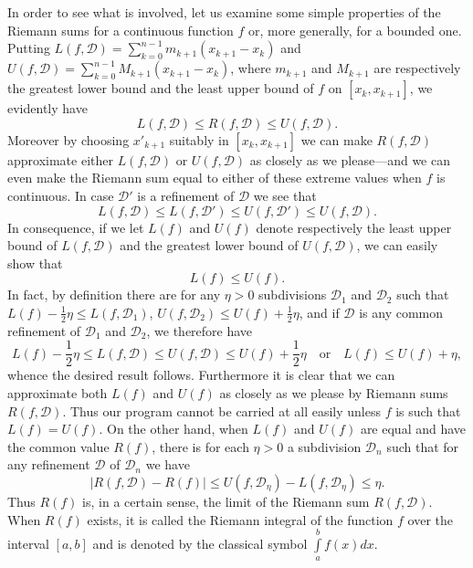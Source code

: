 In order to see what is involved, let us examine some simple
properties of the Riemann sums for a continuous function $f$ or, more
generally, for a bounded one. Putting $L(f,\mathscr{D}) =
\sum\limits^{n-1}_{k=0} m_{k+1} (x_{k+1} - x_k)$ and $U(f,\mathscr{D})
= \sum\limits^{n-1}_{k=0} M_{k+1} (x_{k+1} - x_k)$, where $m_{k+1}$
and $M_{k+1}$ are respectively the greatest lower bound and the least
upper bound of $f$ on $[x_k, x_{k+1}]$, we evidently have
$$
L (f,\mathscr{D}) \leqslant R (f, \mathscr{D}) \leqslant U (f, \mathscr{D}).
$$
Moreover by choosing $x'_{k+1}$ suitably in $[x_k, x_{k+1}]$ we can
make $R(f, \mathscr{D})$ approximate either $L(f, \mathscr{D})$ or
$U(f, \mathscr{D})$ as closely as we please---and we can even make the
Riemann sum equal to either of these extreme values when $f$ is
continuous. In case $\mathscr{D}'$ is a refinement of $\mathscr{D}$ we
see that
$$
L(f, \mathscr{D}) \leqslant L (f, \mathscr{D}') \leqslant U (f,
\mathscr{D}') \leqslant U (f, \mathscr{D}).
$$\pageoriginale
In consequence, if we let $L(f)$ and $U(f)$ denote respectively the
least upper bound of $L(f, \mathscr{D})$ and the greatest lower bound
of $U(f, \mathscr{D})$, we can easily show that
$$
L(f) \leqslant U (f).
$$
In fact, by definition there are for any $\eta > 0$ subdivisions
$\mathscr{D}_1$ and $\mathscr{D}_2$ such that $L(f) - \frac{1}{2} \eta
\leqslant L (f, \mathscr{D}_1)$, $U(f, \mathscr{D}_2) \leqslant U (f) +
\frac{1}{2} \eta$, and if $\mathscr{D}$ is any common refinement of
$\mathscr{D}_1$ and $\mathscr{D}_2$, we therefore have
$$
L(f) - \frac{1}{2} \eta \leqslant L (f, \mathscr{D}) \leqslant U (f,
\mathscr{D}) \leqslant U(f) + \frac{1}{2} \eta \text{~~ or ~~} L (f)
\leqslant U (f) + \eta,
$$
whence the desired result follows. Furthermore it is clear that we can
approximate both $L(f)$ and $U(f)$ as closely as we please by Riemann
sums $R(f,\mathscr{D})$. Thus our program cannot be carried at all
easily unless $f$ is such that $L(f) = U (f)$. On the other hand, when
$L(f)$ and $U(f)$ are equal and have the common value $R(f)$, there is
for each $\eta > 0$ a subdivision $\mathscr{D}_n$ such that for any
refinement $\mathscr{D}$ of $\mathscr{D}_n$ we have 
$$
|R(f,\mathscr{D}) - R(f)|  \leqslant U (f, \mathscr{D}_\eta) - L
(f,\mathscr{D}_\eta) \leqslant \eta.
$$
Thus $R(f)$ is, in a certain sense, the limit of the Riemann sum
$R(f,\mathscr{D})$. When $R(f)$ exists, it is called the Riemann
integral of the function $f$ over the interval $[a,b]$ and is denoted
by the classical symbol $\int\limits^b_a f(x) dx$.

